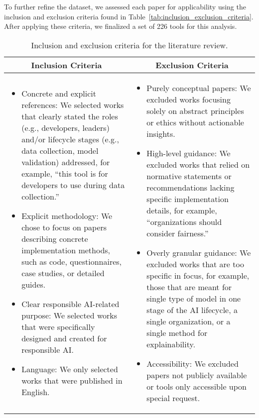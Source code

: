 To further refine the dataset, we assessed each paper for applicability using the inclusion and exclusion criteria found in Table~\ref{tab:inclusion_exclusion_criteria}.
After applying these criteria, we finalized a set of 226 tools for this analysis.

\begin{table}[]
\footnotesize
    \centering
    \caption{Inclusion and exclusion criteria for the literature review.}
    \begin{tabular}{p{}p{}}
         \toprule
         \multicolumn{1}{c}{\textbf{Inclusion Criteria}} & \multicolumn{1}{c}{\textbf{Exclusion Criteria}} \\
         \midrule
\begin{itemize}
    \item Concrete and explicit references: We selected works that clearly stated the roles (e.g., developers, leaders) and/or lifecycle stages (e.g., data collection, model validation) addressed, for example, ``this tool is for developers to use during data collection.''
    \item Explicit methodology: We chose to focus on papers describing concrete implementation methods, such as code, questionnaires, case studies, or detailed guides.
    \item Clear responsible AI-related purpose: We selected works that were specifically designed and created for responsible AI.
    \item Language: We only selected works that were published in English.
\end{itemize}
         & 
\begin{itemize}
    \item Purely conceptual papers: We excluded works focusing solely on abstract principles or ethics without actionable insights.
    \item High-level guidance: We excluded works that relied on normative statements or recommendations lacking specific implementation details, for example, ``organizations should consider fairness.''
    \item Overly granular guidance: We excluded works that are too specific in focus, for example, those that are meant for single type of model in one stage of the AI lifecycle, a single organization, or a single method for explainability.
    \item Accessibility: We excluded papers not publicly available or tools only accessible upon special request. 

\end{itemize}
\end{tabular}
\end{table}

